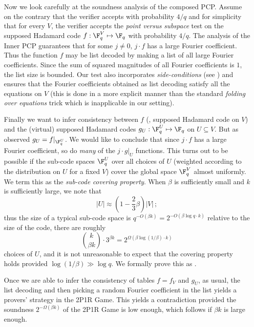 Now we look carefully at the soundness analysis of the composed PCP\@. Assume on the
contrary that the verifier
accepts with probability ${4}/{q}$ and for simplicity that for every $V$,
the verifier accepts
 the \emph{point versus subspace} test on the supposed Hadamard code
$f: \F_q^V \mapsto \F_q$ with probability ${4}/{q}$. The analysis of the Inner PCP
guarantees that for some $j \not=0$, $j\cdot f$ has a large Fourier coefficient.
Thus the function $f$ may be list decoded by making a list of all large Fourier
coefficients. Since the sum of squared magnitudes of all Fourier coefficients is $1$, the list size
is bounded. Our test also incorporates \emph{side-conditions} (see ) and ensures that
 the Fourier coefficients
obtained as list decoding satisfy all the equations on $V$ (this is done
in a more explicit manner than the standard \emph{folding over equations}
trick which is
inapplicable in our setting).

Finally we want to infer consistency between $f$ (\ie, supposed Hadamard code
on $V$) and the (virtual) supposed Hadamard codes $g_U: \F_q^U \mapsto \F_q$
on $U \subseteq V$. But as observed $g_U = f|_{\F_q^U}$.
We would like to conclude that since $j \cdot f$ has a large Fourier coefficient,
so do \emph{many}  of the $j \cdot g|_U$
functions. This turns out to be  possible if the sub-code spaces
$\F_q^U$ over all choices of $U$ (weighted according to the distribution on $U$ for
a fixed $V$) cover the global space $\F_q^V$ almost uniformly. We term this as
the \emph{sub-code covering property}.
When $\beta$ is sufficiently small and $k$ is
sufficiently large, we note that 
\[
|U| \approx \left(1-\frac{2}{3}\beta\right) |V|\,;
\]
thus the size of
a typical sub-code space is $q^{-O(\beta k)} = 2^{-O(\beta \log q \cdot k)}$
relative to the size of the code, there are roughly 
\[
\binom{k}{\beta  k} \cdot 3^{\beta k}
= 2^{\Omega(\beta \log(1/\beta)\cdot k)}
\]
choices of $U$, and it is
not unreasonable to expect that
the covering property holds provided $\log(1/\beta) \gg \log q$.
We formally prove this as .

Once we are able to infer the consistency of tables $f = f_V$ and $g_U$,
as usual, the list decoding and then picking a random Fourier coefficient in the
list yields a provers' strategy in the 2P1R Game. This yields a contradiction
provided the soundness $2^{-\Omega(\beta k)}$ of the 2P1R Game
is low enough, which follows if
$\beta k$ is large enough.

